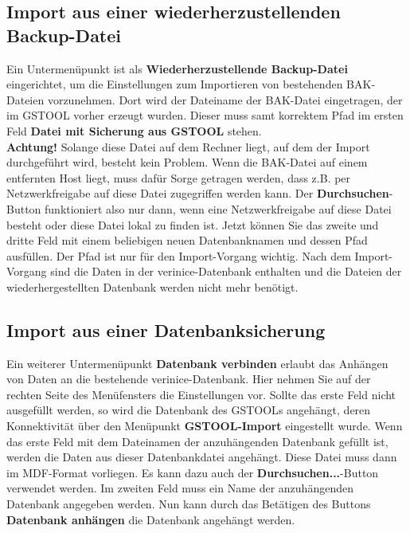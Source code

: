 \documentclass[a4paper,10pt]{book}
\begin{document}
\subsection{Import aus einer wiederherzustellenden Backup-Datei}
Ein Untermenüpunkt ist als \textbf{Wiederherzustellende Backup-Datei} eingerichtet, um die Einstellungen zum Importieren von bestehenden
BAK-Dateien vorzunehmen. Dort wird der Dateiname der BAK-Datei eingetragen, der im \textsc{GSTOOL} vorher erzeugt wurden. Dieser muss samt
korrektem Pfad im ersten Feld \textbf{Datei mit Sicherung aus \textsc{GSTOOL}} stehen.
\newline\\
\textbf{Achtung!} Solange diese Datei auf dem Rechner liegt, auf
dem der Import durchgeführt wird, besteht kein Problem. Wenn die BAK-Datei auf einem entfernten Host liegt, muss dafür Sorge
getragen werden, dass z.B. per Netzwerkfreigabe auf diese Datei zugegriffen werden kann. Der \textbf{Durchsuchen}-Button funktioniert
also nur dann, wenn eine Netzwerkfreigabe auf diese Datei besteht oder diese Datei lokal zu finden ist. Jetzt können Sie das
zweite und dritte Feld mit einem beliebigen neuen Datenbanknamen und dessen Pfad ausfüllen. Der Pfad ist nur für den Import-Vorgang
wichtig. Nach dem Import-Vorgang sind die Daten in der verinice-Datenbank enthalten und die Dateien der wiederhergestellten
Datenbank werden nicht mehr benötigt.

\subsection{Import aus einer Datenbanksicherung}
Ein weiterer Untermenüpunkt \textbf{Datenbank verbinden} erlaubt das Anhängen von Daten an die bestehende verinice-Datenbank. Hier nehmen
Sie auf der rechten Seite des Menüfensters die Einstellungen vor. Sollte das erste Feld nicht ausgefüllt werden, so wird die
Datenbank des \textsc{GSTOOL}s angehängt, deren Konnektivität über den Menüpunkt \textbf{\textsc{GSTOOL}-Import} eingestellt wurde. Wenn das erste Feld
mit dem Dateinamen der anzuhängenden Datenbank gefüllt ist, werden die Daten aus dieser Datenbankdatei angehängt. Diese Datei
muss dann im MDF-Format vorliegen. Es kann dazu auch der \textbf{Durchsuchen...}-Button verwendet werden. Im zweiten Feld muss ein
Name der anzuhängenden Datenbank angegeben werden. Nun kann durch das Betätigen des Buttons \textbf{Datenbank anhängen} die Datenbank angehängt werden.
\end{document}

